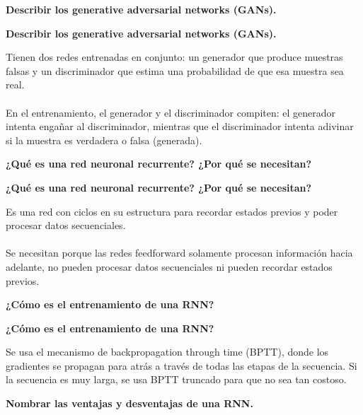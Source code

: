 \documentclass[10pt]{memoir}
\begin{document}
\clearpage
\begin{center}
	\textbf{\Large Describir los generative adversarial networks (GANs).}
\end{center}

\clearpage
\begin{center}
	\textbf{\Large Describir los generative adversarial networks (GANs).}
\end{center}
\noindent Tienen dos redes entrenadas en conjunto: un generador que produce muestras falsas y un discriminador que estima una probabilidad de que esa muestra sea real. \\
\\
\noindent En el entrenamiento, el generador y el discriminador compiten: el generador intenta engañar al discriminador, mientras que el discriminador intenta adivinar si la muestra es verdadera o falsa (generada).


\clearpage
\begin{center}
	\textbf{\Large ¿Qué es una red neuronal recurrente? ¿Por qué se necesitan?}
\end{center}

\clearpage
\begin{center}
	\textbf{\Large ¿Qué es una red neuronal recurrente? ¿Por qué se necesitan?}
\end{center}
\noindent Es una red con ciclos en su estructura para recordar estados previos y poder procesar datos secuenciales. \\
\\
\noindent Se necesitan porque las redes feedforward solamente procesan información hacia adelante, no pueden procesar datos secuenciales ni pueden recordar estados previos.

\clearpage
\begin{center}
	\textbf{\Large ¿Cómo es el entrenamiento de una RNN?}
\end{center}

\clearpage
\begin{center}
	\textbf{\Large ¿Cómo es el entrenamiento de una RNN?}
\end{center}
\noindent Se usa el mecanismo de backpropagation through time (BPTT), donde los gradientes se propagan para atrás a través de todas las etapas de la secuencia. Si la secuencia es muy larga, se usa BPTT truncado para que no sea tan costoso.

\clearpage
\begin{center}
	\textbf{\Large Nombrar las ventajas y desventajas de una RNN.}
\end{center}
\end{document}

